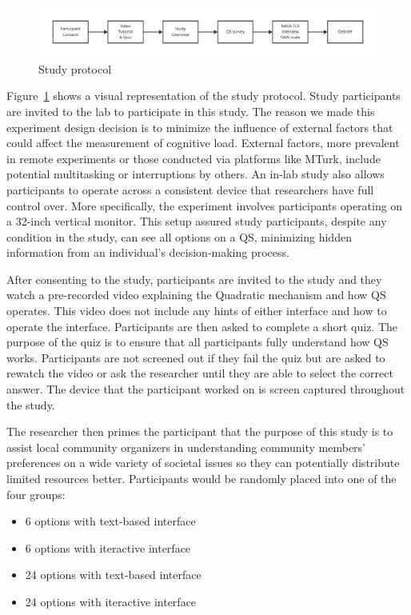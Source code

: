 \begin{figure}[h]
    \centering
    \includegraphics[width=1\textwidth]{content/image/study_flow.pdf}
    \caption{Study protocol}
    \label{fig:studyProtocol}
\end{figure}

Figure~\ref{fig:studyProtocol} shows a visual representation of the study protocol. Study participants are invited to the lab to participate in this study. The reason we made this experiment design decision is to minimize the influence of external factors that could affect the measurement of cognitive load. External factors, more prevalent in remote experiments or those conducted via platforms like MTurk, include potential multitasking or interruptions by others. An in-lab study also allows participants to operate across a consistent device that researchers have full control over. More specifically, the experiment involves participants operating on a 32-inch vertical monitor. This setup assured study participants, despite any condition in the study, can see all options on a QS, minimizing hidden information from an individual's decision-making process.

After consenting to the study, participants are invited to the study and they watch a pre-recorded video explaining the Quadratic mechanism and how QS operates. This video does not include any hints of either interface and how to operate the interface. Participants are then asked to complete a short quiz. The purpose of the quiz is to ensure that all participants fully understand how QS works. Participants are not screened out if they fail the quiz but are asked to rewatch the video or ask the researcher until they are able to select the correct answer. The device that the participant worked on is screen captured throughout the study.

The researcher then primes the participant that the purpose of this study is to assist local community organizers in understanding community members' preferences on a wide variety of societal issues so they can potentially distribute limited resources better. Participants would be randomly placed into one of the four groups:

\begin{itemize}
    \item 6 options with text-based interface
    \item 6 options with iteractive interface
    \item 24 options with text-based interface
    \item 24 options with iteractive interface
\end{itemize}

